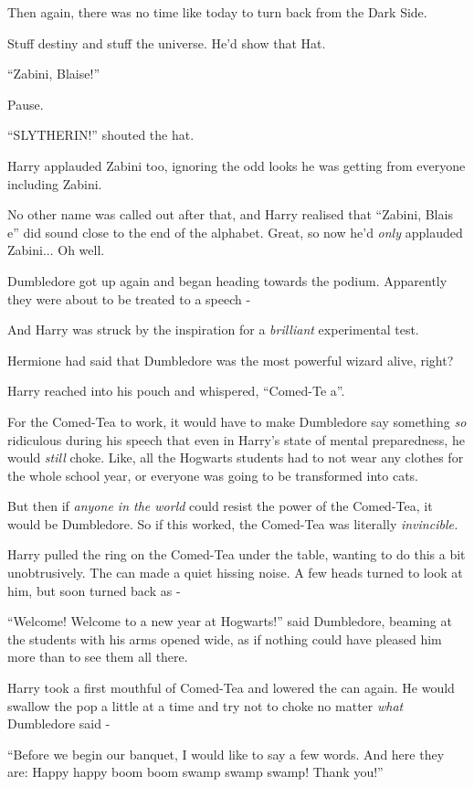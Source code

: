 Then again, there was no time like today to turn back from the Dark Side.

Stuff destiny and stuff the universe. He'd show that Hat.

``Zabini, Blaise!''

Pause.

``SLYTHERIN!'' shouted the hat.

Harry applauded Zabini too, ignoring the odd looks he was getting from everyone including Zabini.

No other name was called out after that, and Harry realised that ``Zabini, Blais e'' did sound close to the end of the alphabet. Great, so now he'd \emph{only} applauded Zabini... Oh well.

Dumbledore got up again and began heading towards the podium. Apparently they were about to be treated to a speech -

And Harry was struck by the inspiration for a \emph{brilliant} experimental test.

Hermione had said that Dumbledore was the most powerful wizard alive, right?

Harry reached into his pouch and whispered, ``Comed-Te a''.

For the Comed-Tea to work, it would have to make Dumbledore say something \emph{so} ridiculous during his speech that even in Harry's state of mental preparedness, he would \emph{still} choke. Like, all the Hogwarts students had to not wear any clothes for the whole school year, or everyone was going to be transformed into cats.

But then if \emph{anyone in the world} could resist the power of the Comed-Tea, it would be Dumbledore. So if this worked, the Comed-Tea was literally \emph{invincible.}

Harry pulled the ring on the Comed-Tea under the table, wanting to do this a bit unobtrusively. The can made a quiet hissing noise. A few heads turned to look at him, but soon turned back as -

``Welcome! Welcome to a new year at Hogwarts!'' said Dumbledore, beaming at the students with his arms opened wide, as if nothing could have pleased him more than to see them all there.

Harry took a first mouthful of Comed-Tea and lowered the can again. He would swallow the pop a little at a time and try not to choke no matter \emph{what} Dumbledore said -

``Before we begin our banquet, I would like to say a few words. And here they are: Happy happy boom boom swamp swamp swamp! Thank you!''

